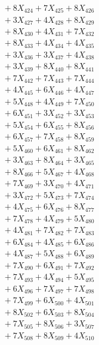 \documentclass[a4paper,10pt]{article}
\begin{document}
{\begin{align}
&\;  + 8 X_{424} + 7 X_{425} + 8 X_{426} \\[0.3ex]
&\;  + 3 X_{427} + 4 X_{428} + 8 X_{429} \\[0.5ex]\allowbreak
&\;  + 8 X_{430} + 4 X_{431} + 7 X_{432} \\[0.3ex]
&\;  + 8 X_{433} + 4 X_{434} + 4 X_{435} \\[0.3ex]
&\;  + 3 X_{436} + 3 X_{437} + 4 X_{438} \\[0.3ex]
&\;  + 3 X_{439} + 8 X_{440} + 8 X_{441} \\[0.3ex]
&\;  + 7 X_{442} + 7 X_{443} + 7 X_{444} \\[0.3ex]
&\;  + 4 X_{445} + 6 X_{446} + 4 X_{447} \\[0.3ex]
&\;  + 5 X_{448} + 4 X_{449} + 7 X_{450} \\[0.3ex]
&\;  + 6 X_{451} + 3 X_{452} + 3 X_{453} \\[0.3ex]
&\;  + 5 X_{454} + 6 X_{455} + 8 X_{456} \\[0.3ex]
&\;  + 6 X_{457} + 7 X_{458} + 8 X_{459} \\[0.5ex]\allowbreak
&\;  + 5 X_{460} + 6 X_{461} + 8 X_{462} \\[0.3ex]
&\;  + 3 X_{463} + 8 X_{464} + 3 X_{465} \\[0.3ex]
&\;  + 8 X_{466} + 5 X_{467} + 4 X_{468} \\[0.3ex]
&\;  + 7 X_{469} + 3 X_{470} + 4 X_{471} \\[0.3ex]
&\;  + 3 X_{472} + 5 X_{473} + 7 X_{474} \\[0.3ex]
&\;  + 4 X_{475} + 6 X_{476} + 8 X_{477} \\[0.3ex]
&\;  + 7 X_{478} + 4 X_{479} + 5 X_{480} \\[0.3ex]
&\;  + 4 X_{481} + 7 X_{482} + 7 X_{483} \\[0.3ex]
&\;  + 6 X_{484} + 4 X_{485} + 6 X_{486} \\[0.3ex]
&\;  + 4 X_{487} + 5 X_{488} + 6 X_{489} \\[0.5ex]\allowbreak
&\;  + 7 X_{490} + 6 X_{491} + 7 X_{492} \\[0.3ex]
&\;  + 7 X_{493} + 4 X_{494} + 5 X_{495} \\[0.3ex]
&\;  + 6 X_{496} + 7 X_{497} + 7 X_{498} \\[0.3ex]
&\;  + 7 X_{499} + 6 X_{500} + 4 X_{501} \\[0.3ex]
&\;  + 8 X_{502} + 6 X_{503} + 8 X_{504} \\[0.3ex]
&\;  + 7 X_{505} + 8 X_{506} + 3 X_{507} \\[0.3ex]
&\;  + 7 X_{508} + 8 X_{509} + 4 X_{510} \\[0.3ex]

\end{align}}
\end{document}
